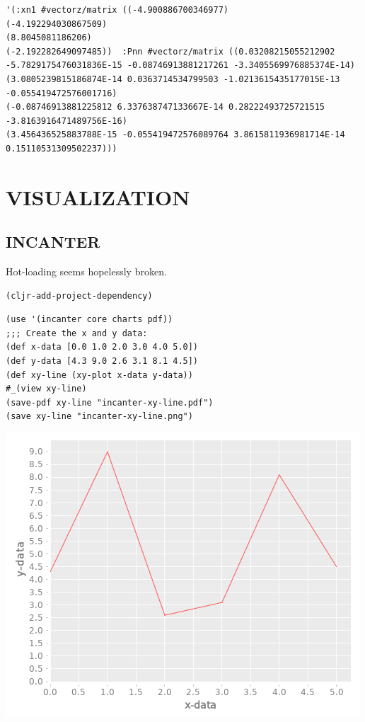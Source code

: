 \documentclass[10pt,oneside,x11names]{article}
\begin{document}
\begin{verbatim}
'(:xn1 #vectorz/matrix ((-4.900886700346977)
(-4.192294030867509)
(8.8045081186206)
(-2.192282649097485))  :Pnn #vectorz/matrix ((0.03208215055212902 -5.7829175476031836E-15 -0.08746913881217261 -3.3405569976885374E-14)
(3.0805239815186874E-14 0.0363714534799503 -1.0213615435177015E-13 -0.055419472576001716)
(-0.08746913881225812 6.337638747133667E-14 0.28222493725721515 -3.8163916471489756E-16)
(3.456436525883788E-15 -0.055419472576089764 3.8615811936981714E-14 0.15110531309502237)))
\end{verbatim}

\section{VISUALIZATION}
\label{oz-for-visualization}
\subsection{INCANTER}
\label{sec:org53b414d}

Hot-loading seems hopelessly broken.

\begin{verbatim}
(cljr-add-project-dependency)
\end{verbatim}

\begin{verbatim}
(use '(incanter core charts pdf))
;;; Create the x and y data:
(def x-data [0.0 1.0 2.0 3.0 4.0 5.0])
(def y-data [4.3 9.0 2.6 3.1 8.1 4.5])
(def xy-line (xy-plot x-data y-data))
#_(view xy-line)
(save-pdf xy-line "incanter-xy-line.pdf")
(save xy-line "incanter-xy-line.png")
\end{verbatim}

\begin{center}
\includegraphics[width=.9\linewidth]{incanter-xy-line.png}
\end{center}
\end{document}
